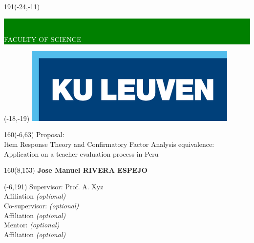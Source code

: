 \documentclass[12pt,a4paper,oneside]{article}
\begin{document}
%
\graphicspath{{./images/}} 	          %
%
\thispagestyle{empty}
\newcommand{\form}[1]{\scalebox{1.087}{\boldmath{#1}}}
\sffamily
%
\begin{textblock}{191}(-24,-11)
\colorbox{green}{\hspace{139mm}\ \parbox[c][18truemm]{52mm}{\textcolor{white}{FACULTY OF SCIENCE}}}
\end{textblock}
%
\begin{textblock}{70}(-18,-19)
\textblockcolour{}
\includegraphics*[height=19.8truemm]{LogoKULeuven}
\end{textblock}
%
\begin{textblock}{160}(-6,63)
\textblockcolour{}
\vspace{-\parskip}
\flushleft
\fontsize{40}{42}\selectfont \textcolor{bluetitle}{Proposal:}\\[1.5mm]
\fontsize{20}{22}\selectfont Item Response Theory and Confirmatory Factor Analysis equivalence: Application on a teacher evaluation process in Peru \\
\end{textblock}
%
\begin{textblock}{160}(8,153)
\textblockcolour{}
\vspace{-\parskip}
\flushright
\fontsize{14}{16}\selectfont \textbf{Jose Manuel RIVERA ESPEJO}
\end{textblock}
%
\begin{textblock}{70}(-6,191)
\textblockcolour{}
\vspace{-\parskip}
\flushleft
Supervisor: Prof. A. Xyz\\[-2pt]
\textcolor{blueaff}{Affiliation \textsl{(optional)}}\\[5pt]
Co-supervisor: \textsl{(optional)}\\[-2pt]
\textcolor{blueaff}{Affiliation \textsl{(optional)}}\\[5pt]
Mentor: \textsl{(optional)}\\[-2pt]
\textcolor{blueaff}{Affiliation \textsl{(optional)}}\\
\end{textblock}
\end{document}
